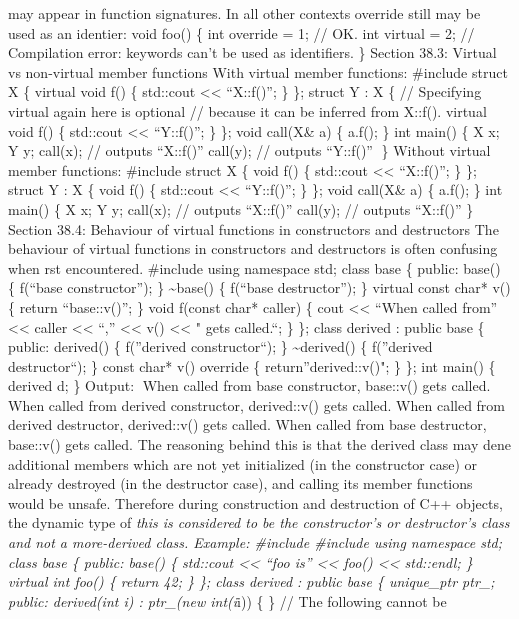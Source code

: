 may appear in function signatures. In all other contexts override still
may be used as an identier: void foo() \{ int override = 1; // OK. int
virtual = 2; // Compilation error: keywords can't be used as
identifiers. \} Section 38.3: Virtual vs non-virtual member functions
With virtual member functions: \#include struct X \{ virtual void f() \{
std::cout \textless\textless{} ``X::f()\n''; \} \}; struct Y : X \{ //
Specifying virtual again here is optional // because it can be inferred
from X::f(). virtual void f() \{ std::cout \textless\textless{}
``Y::f()\n''; \} \}; void call(X\& a) \{ a.f(); \} int main() \{ X x; Y
y; call(x); // outputs ``X::f()'' call(y); // outputs ``Y::f()'' \}
Without virtual member functions: \#include struct X \{ void f() \{
std::cout \textless\textless{} ``X::f()\n''; \} \}; struct Y : X \{ void
f() \{ std::cout \textless\textless{} ``Y::f()\n''; \} \}; void call(X\&
a) \{ a.f(); \} int main() \{ X x; Y y; call(x); // outputs ``X::f()''
call(y); // outputs ``X::f()'' \} Section 38.4: Behaviour of virtual
functions in constructors and destructors The behaviour of virtual
functions in constructors and destructors is often confusing when rst
encountered. \#include using namespace std; class base \{ public: base()
\{ f(``base constructor''); \} \textasciitilde base() \{ f(``base
destructor''); \} virtual const char* v() \{ return ``base::v()''; \}
void f(const char* caller) \{ cout \textless\textless{} ``When called
from'' \textless\textless{} caller \textless\textless{} ``,''
\textless\textless{} v() \textless\textless{} " gets called.\n``; \} \};
class derived : public base \{ public: derived() \{ f(''derived
constructor``); \} \textasciitilde derived() \{ f(''derived
destructor``); \} const char* v() override \{ return''derived::v()"; \}
\}; int main() \{ derived d; \} Output: When called from base
constructor, base::v() gets called. When called from derived
constructor, derived::v() gets called. When called from derived
destructor, derived::v() gets called. When called from base destructor,
base::v() gets called. The reasoning behind this is that the derived
class may dene additional members which are not yet initialized (in the
constructor case) or already destroyed (in the destructor case), and
calling its member functions would be unsafe. Therefore during
construction and destruction of C++ objects, the dynamic type of
\emph{this is considered to be the constructor's or destructor's class
and not a more-derived class. Example: \#include \#include using
namespace std; class base \{ public: base() \{ std::cout
\textless\textless{} ``foo is'' \textless\textless{} foo()
\textless\textless{} std::endl; \} virtual int foo() \{ return 42; \}
\}; class derived : public base \{ unique\_ptr ptr\_; public:
derived(int i) : ptr\_(new int(i}i)) \{ \} // The following cannot be
